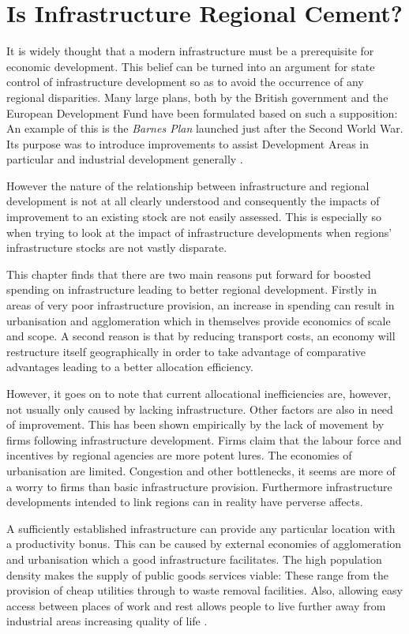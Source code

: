 \chapter{Is Infrastructure Regional Cement?}

It is widely thought that a modern infrastructure must be a prerequisite for economic development. This belief can be turned into an argument for state control of infrastructure development so as to avoid the occurrence of any regional disparities. Many large plans, both by the British government and the European Development Fund have been formulated based on such a supposition: An example of this is the \textit{Barnes Plan} launched just after the Second World War. Its purpose was to introduce improvements to assist Development Areas in particular and industrial development generally \citep{Rodgers:1959}.

However the nature of the relationship between infrastructure and regional development is not at all clearly understood and consequently the impacts of improvement to an existing stock are not easily assessed. This is especially so when trying to look at the impact of infrastructure developments when regions' infrastructure stocks are not vastly disparate.

This chapter finds that there are two main reasons put forward for boosted spending on infrastructure leading to better regional development. Firstly in areas of very poor infrastructure provision, an increase in spending can result in urbanisation and agglomeration which in themselves provide economics of scale and scope. A second reason is that by reducing transport costs, an economy will restructure itself geographically in order to take advantage of comparative advantages leading to a better allocation efficiency.

However, it goes on to note that current allocational inefficiencies are, however, not usually only caused by lacking infrastructure. Other factors are also in need of improvement. This has been shown empirically by the lack of movement by firms following infrastructure development. Firms claim that the labour force and incentives by regional agencies are more potent lures. The economies of urbanisation are limited. Congestion and other bottlenecks, it seems are more of a worry to firms than basic infrastructure provision. Furthermore infrastructure developments intended to link regions can in reality have perverse affects.
 
A sufficiently established infrastructure can provide any particular location with a productivity bonus. This can be caused by external economies of agglomeration and urbanisation which a good infrastructure facilitates. The high population density makes the supply of public goods services viable: These range from the provision of cheap utilities through to waste removal facilities. Also, allowing easy access between places of work and rest allows people to live further away from industrial areas increasing quality of life \citep{Henderson:1988}.

